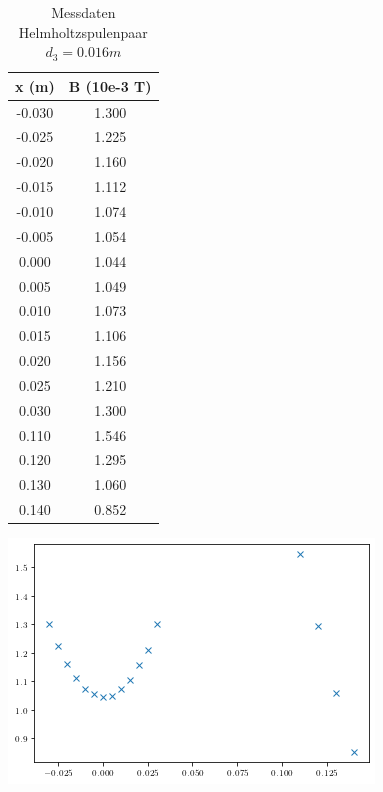 \begin{table}
  \centering
  \caption{Messdaten Helmholtzspulenpaar $d_{3} = 0.016m$}
  \begin{tabular}{c c}
    \toprule
     x (m) &  B (10e-3 T) \\
    \midrule
    -0.030 &        1.300 \\
    -0.025 &        1.225 \\
    -0.020 &        1.160 \\
    -0.015 &        1.112 \\
    -0.010 &        1.074 \\
    -0.005 &        1.054 \\
     0.000 &        1.044 \\
     0.005 &        1.049 \\
     0.010 &        1.073 \\
     0.015 &        1.106 \\
     0.020 &        1.156 \\
     0.025 &        1.210 \\
     0.030 &        1.300 \\
     0.110 &        1.546 \\
     0.120 &        1.295 \\
     0.130 &        1.060 \\
     0.140 &        0.852 \\
    \bottomrule
  \end{tabular}
\end{table}

  \includegraphics[width=\textwidth]{pictures/Helmholtz3.png}    %

